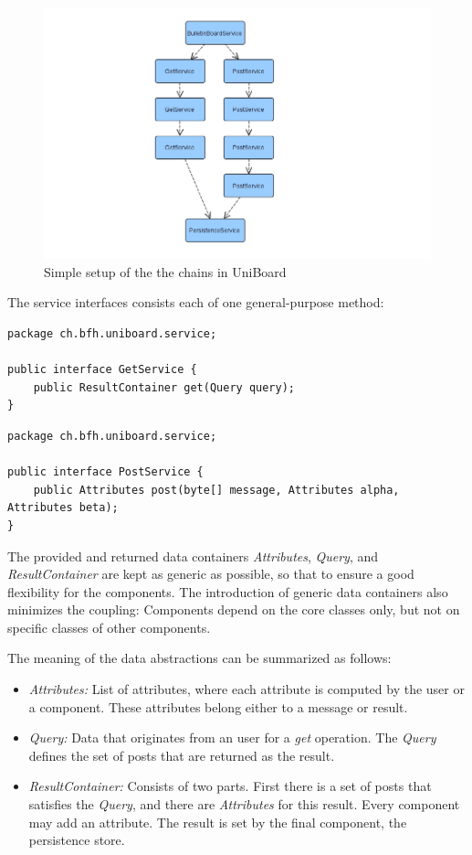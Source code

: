 \documentclass[oneside]{scrreprt}
\newcommand{\uniboard}{\mbox{UniBoard}}
\begin{document}
\begin{figure}[ht]
\centerline{
\includegraphics[width=1.0\textwidth]{figs/chainsofcomp}}
\caption{Simple setup of the the chains in \uniboard}
\label{fig:chains-of-components}
\end{figure}

The service interfaces consists each of one
general-purpose method:

\begin{lstlisting}[style=javastyle]
package ch.bfh.uniboard.service;

public interface GetService {
    public ResultContainer get(Query query);
}
\end{lstlisting}

\begin{lstlisting}[style=javastyle]
package ch.bfh.uniboard.service;

public interface PostService {
    public Attributes post(byte[] message, Attributes alpha, Attributes beta);
}
\end{lstlisting}

The provided and returned data containers \emph{Attributes},
\emph{Query}, and \emph{ResultContainer} are kept as generic as possible, so that to ensure 
a good flexibility for the components. The introduction of generic
data containers also minimizes the coupling: Components depend on
the core classes only, but not on specific classes of other
components.

The meaning of the data abstractions can be summarized as follows:

\begin{itemize}
	\item \emph{Attributes:} List of attributes, where each attribute is computed
		by the user or a component. These attributes belong either to a message or result.
	\item \emph{Query:} Data that originates from an user
		for a \emph{get} operation. The \emph{Query} defines the set of posts that are returned as the result.
	\item \emph{ResultContainer:} Consists of two parts. First there is a set of posts that satisfies the \emph{Query}, and there are \emph{Attributes} for this result. Every component may add an attribute. The result is set by the final component, the persistence store.
\end{itemize}
\end{document}
